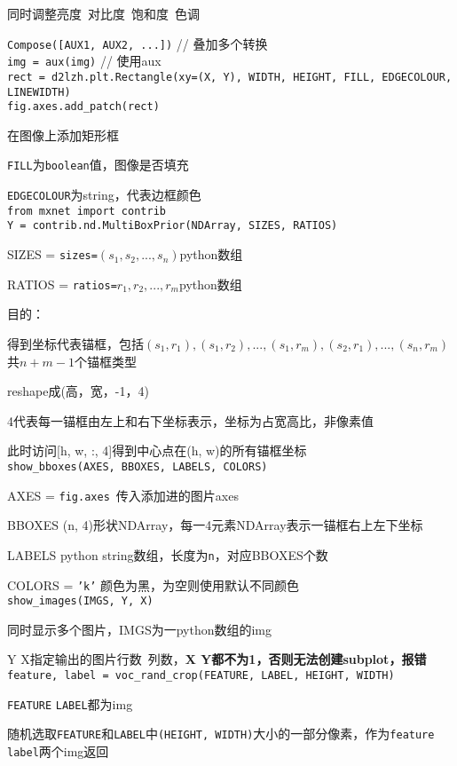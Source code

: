 \documentclass[UTF8]{ctexart}
\begin{document}
  \quad 同时调整亮度\ 对比度\ 饱和度\ 色调
  
  \texttt{Compose([AUX1, AUX2, ...])} // 叠加多个转换\\
\texttt{img = aux(img)} // 使用aux\\
\texttt{rect = d2lzh.plt.Rectangle(xy=(X, Y), WIDTH, HEIGHT, FILL, EDGECOLOUR, LINEWIDTH)}\\
\texttt{fig.axes.add\_patch(rect)}
  
  在图像上添加矩形框

  \texttt{FILL}为\texttt{boolean}值，图像是否填充

  \texttt{EDGECOLOUR}为string，代表边框颜色\\
\texttt{from mxnet import contrib}\\
\texttt{Y = contrib.nd.MultiBoxPrior(NDArray, SIZES, RATIOS)}

  SIZES = \texttt{sizes=}$(s_1, s_2,...,s_n)$python数组

  RATIOS = \texttt{ratios=}$r_1, r_2, ...,r_m$python数组

  目的：
  
  \quad 得到坐标代表锚框，包括$(s_1, r_1), (s_1, r_2), ..., (s_1, r_m), (s_2, r_1), ..., (s_n, r_m)$共$n+m-1$个锚框类型

  \quad reshape成(高，宽，-1，4)

  \quad 4代表每一锚框由左上和右下坐标表示，坐标为占宽高比，非像素值

  \quad \quad 此时访问[h, w, :, 4]得到中心点在(h, w)的所有锚框坐标\\
\texttt{show\_bboxes(AXES, BBOXES, LABELS, COLORS)}

  AXES = \texttt{fig.axes}\ 传入添加进的图片axes

  BBOXES (n, 4)形状NDArray，每一4元素NDArray表示一锚框右上左下坐标

  LABELS python string数组，长度为\texttt{n}，对应BBOXES个数

  COLORS = \texttt{'k'} 颜色为黑，为空则使用默认不同颜色\\
\texttt{show\_images(IMGS, Y, X)}

  同时显示多个图片，IMGS为一python数组的img

  Y X指定输出的图片行数\ 列数，\textbf{X Y都不为1，否则无法创建subplot，报错}\\
\texttt{feature, label = voc\_rand\_crop(FEATURE, LABEL, HEIGHT, WIDTH)}

  \texttt{FEATURE} \texttt{LABEL}都为img

  随机选取\texttt{FEATURE}和\texttt{LABEL}中\texttt{(HEIGHT, WIDTH)}大小的一部分像素，作为\texttt{feature} \texttt{label}两个img返回
  
\end{document}
